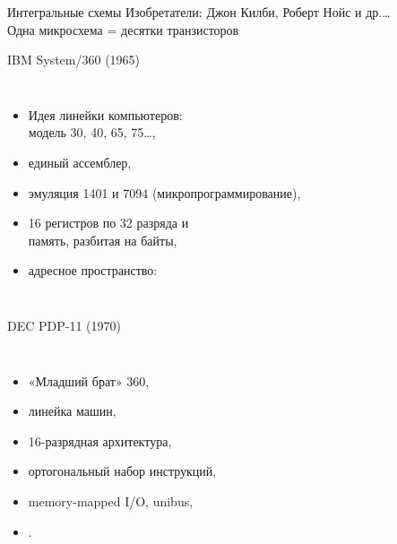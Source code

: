 \begin{frame}{Интегральные схемы}
\vspace{-.3cm}
Изобретатели: Джон Килби, Роберт Нойс и др.…\\
Одна микросхема = десятки транзисторов
\end{frame}

\begin{frame}{IBM System/360 (1965)}
\begin{columns}
    \column{6cm}
\begin{itemize}[<+->]
    \item Идея линейки компьютеров:\\модель 30, 40, 65, 75…,
    \item единый ассемблер,
    \item эмуляция 1401 и 7094 (микропрограммирование),
    \item 16 регистров по 32 разряда и\\
        память, разбитая на \alert{байты},
    \item адресное пространство:\\
\end{itemize}


    \column{5cm}
\end{columns}


\end{frame}

\begin{frame}{DEC PDP-11 (1970)}
\begin{columns}
    \column{7cm}
\begin{itemize}%
    \item «Младший брат» 360,
    \item линейка машин,
    \item 16-разрядная архитектура,
    \item ортогональный набор инструкций,
    \item memory-mapped I/O, unibus,
    \item {}.
\end{itemize}

    \column{5cm}
\end{columns}
\end{frame}

